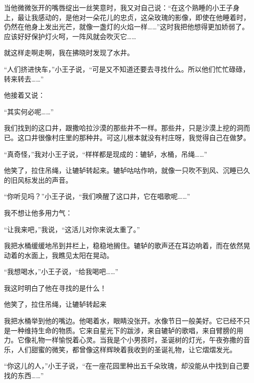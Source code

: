 当他微微张开的嘴唇绽出一丝笑意时，我又对自己说：“在这个熟睡的小王子身上，最让我感动的，是他对一朵花儿的忠贞，这朵玫瑰的影像，即使在他睡着时，仍然在他身上发出光芒，就像一盏灯的火焰一样\ldots{}\ldots{}”这时我把他想得更加娇弱了。应该好好保护灯火呵，一阵风就会吹灭它\ldots{}\ldots{}

就这样走啊走啊，我在拂晓时发现了水井。


\stoptitle

\starttitle[title={25},reference={part0027.html_a028}]

“人们挤进快车，”小王子说，“可是又不知道还要去寻找什么。所以他们忙忙碌碌，转来转去\ldots{}\ldots{}”

他接着又说：

“其实何必呢\ldots{}\ldots{}”

我们找到的这口井，跟撒哈拉沙漠的那些井不一样。那些井，只是沙漠上挖的洞而已。这口井很像村庄里的那种井。可这儿根本就没有村庄呀，我觉得自己在做梦。

“真奇怪，”我对小王子说，“样样都是现成的：辘轳，水桶，吊绳\ldots{}\ldots{}”

他笑了，拉住吊绳，让辘轳转起来。辘轳咕咕作响，就像一只吹不到风、沉睡已久的旧风标发出的声音。

“你听见吗？”小王子说，“我们唤醒了这口井，它在唱歌呢\ldots{}\ldots{}”

我不想让他多用力气：

“让我来吧，”我说，“这活儿对你来说太重了。”

我把水桶缓缓地吊到井栏上，稳稳地搁住。辘轳的歌声还在耳边响着，而在依然晃动着的水面上，我瞧见太阳在晃动。

“我想喝水，”小王子说，“给我喝吧\ldots{}\ldots{}”

我这时明白了他在寻找的是什么！

{\startalignment[center]
 \stopalignment}

他笑了，拉住吊绳，让辘轳转起来

我把水桶举到他的嘴边。他喝着水，眼睛没张开。水像节日一般美好。它已经不只是一种维持生命的物质。它来自星光下的跋涉，来自辘轳的歌唱，来自臂膀的用力。它像礼物一样愉悦着心灵。当我是个小男孩时，圣诞树的灯光，午夜弥撒的音乐，人们甜蜜的微笑，都曾像这样辉映着我收到的圣诞礼物，让它熠熠发光。

“你这儿的人，”小王子说，“在一座花园里种出五千朵玫瑰，却没能从中找到自己要找的东西\ldots{}\ldots{}”

